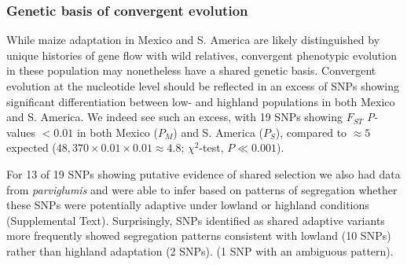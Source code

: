 {{%


\subsubsection{Genetic basis of convergent evolution}


While maize adaptation in Mexico and S. America are likely distinguished by unique histories of gene flow with wild relatives, convergent phenotypic evolution in these population may nonetheless have a shared genetic basis.   
Convergent evolution at the nucleotide level should be reflected in an excess of SNPs showing significant differentiation between low- and highland populations in both Mexico and S. America. 
We indeed see such an excess, with 19 SNPs showing $F_{ST}$ \emph{P}-values  $<0.01$ in both Mexico ($P_M$) and S. America ($P_S$), compared to $\approx 5$ expected ($48,370\times 0.01 \times 0.01 \approx 4.8$; $\chi^2$-test, $P\ll0.001$).


For 13 of 19 SNPs showing putative evidence of shared selection we also had data from \textit{parviglumis} and were able to infer based on patterns of segregation whether these SNPs were potentially adaptive under lowland or highland conditions (Supplemental Text).  
Surprisingly, SNPs identified as shared adaptive variants more frequently showed segregation patterns consistent with lowland  (10 SNPs) rather than highland adaptation (2 SNPs). (1 SNP with an ambiguous pattern). 

}}

